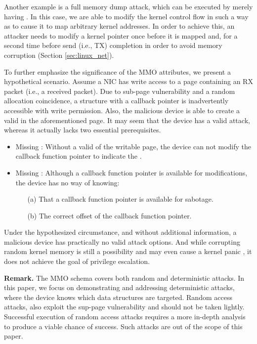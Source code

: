 Another example is a full memory dump attack, which can be executed by merely having \oportunity. In this case, we are able to modify the kernel control flow in such a way as to cause it to map arbitrary kernel addresses. In order to achieve this, an attacker needs to modify a kernel pointer once before it is mapped and, for a second time before send (i.e., TX) completion in order to avoid memory corruption (Section \ref{sec:linux_net}). 

To further emphasize the significance of the MMO attributes, we present a hypothetical scenario. Assume a NIC has write access to a page containing an RX packet (i.e., a received packet). Due to sub-page vulnerability and a random allocation coincidence, a structure with a callback pointer is inadvertently accessible with write permission. Also, the malicious device is able to create a valid \mabaf{} in the aforementioned page. It may seem that the device has a valid attack, whereas it actually lacks two essential prerequisites.

\begin{itemize}
    \item Missing \means: Without a valid \kva{} of the writable page, the device can not modify the callback function pointer to indicate the \mabaf.
    \item Missing \oportunity: Although a callback function pointer is available for modifications, the device has no way of knowing: 
    \begin{enumerate}
        \item[(a)] That a callback function pointer is available for sabotage.
        \item[(b)] The correct offset of the callback function pointer.
    \end{enumerate}
\end{itemize}

Under the hypothesized circumstance, and without additional information, a malicious device has practically no valid attack options. 
And while corrupting random kernel memory is still a possibility and may even cause a kernel panic \cite{MMT16}, it does not achieve the goal of privilege escalation.


\smallskip
\noindent\textbf{Remark.} The MMO schema covers both random and deterministic attacks. In this paper, we focus on demonstrating and addressing deterministic attacks, where the device knows which data structures are targeted. Random access attacks, also exploit the sup-page vulnerability and should not be taken lightly. Successful execution of random access attacks requires a more in-depth analysis to produce a viable chance of success. Such attacks are out of the scope of this paper. 

